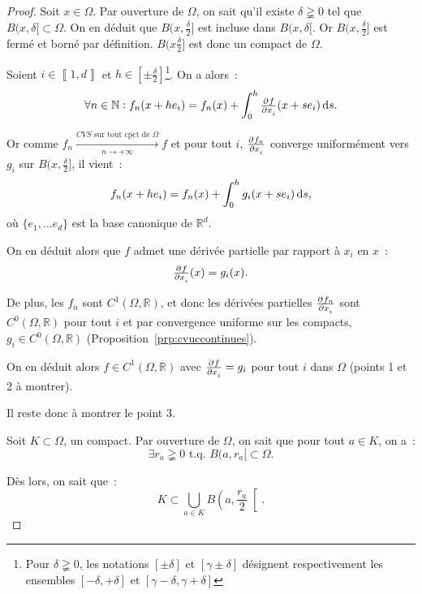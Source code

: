 \documentclass{report}
\theoremstyle{definition}
\theoremstyle{remark}
\numberwithin{equation}{section}
\newcommand{\R}{\mathbb R}
\newcommand{\N}{\mathbb N}
\newcommand{\tq}{\text{ t.q. }}
\newcommand{\CONV}[5]{\xrightarrow[#2 \to #3]{#4 \text{ #5 } #1}}
\newcommand{\CVSc}[3]{\CONV{#1}{#2}{#3}{CVS}{sur tout cpct de}}
\newcommand{\intint}[2]{\left\llbracket#1, #2\right\rrbracket}
\newcommand{\pinfty}{{+\infty}}
\begin{document}
			\begin{proof} Soit $x \in \Omega$. Par ouverture de $\Omega$, on sait qu'il existe $\delta \gneqq 0$ tel que $B(x, \delta[ \subset \Omega$.
			On en déduit que $B(x, \frac \delta2]$ est incluse dans $B(x, \delta[$. Or $B(x, \frac \delta2]$ est fermé et borné par définition.
			$B(x \frac \delta2]$ est donc un compact de $\Omega$.

			Soient $i \in \intint 1d$ et $h \in [\pm \frac \delta2]$\footnote{Pour $\delta \gneqq 0$, les notations $[\pm \delta]$ et $[\gamma \pm \delta]$
			désignent respectivement les ensembles $[-\delta, +\delta]$ et $[\gamma-\delta, \gamma+\delta]$}. On a alors~:
			\begin{equation}
				\forall n \in \N : f_n(x + he_i) = f_n(x) + \int_0^h\pd f{x_i}(x+s e_i)\dif s.
			\end{equation}

			Or comme $f_n \CVSc \Omega n\pinfty f$ et pour tout $i$, $\pd {f_n}{x_i}$ converge uniformément vers $g_i$ sur $B(x, \frac \delta2]$, il vient~:
			\begin{equation}
				f_n(x + he_i) = f_n(x) + \int_0^hg_i(x+se_i)\dif s,
			\end{equation}
			où $\{e_1, \ldots e_d\}$ est la base canonique de $\R^d$.

			On en déduit alors que $f$ admet une dérivée partielle par rapport à $x_i$ en $x$~:
			\begin{equation}
				\pd f{x_i}(x) = g_i(x).
			\end{equation}

			De plus, les $f_n$ sont $C^1(\Omega, \R)$, et donc les dérivées partielles $\pd {f_n}{x_i}$ sont $C^0(\Omega, \R)$ pour tout $i$ et par convergence
			uniforme sur les compacts, $g_i \in C^0(\Omega, \R)$ (Proposition~\ref{prp:cvuccontinues}).

			On en déduit alors $f \in C^1(\Omega, \R)$ avec $\pd f{x_i} = g_i$ pour tout $i$ dans $\Omega$ (points 1 et 2 à montrer).

			Il reste donc à montrer le point 3.

			Soit $K \subset \Omega$, un compact. Par ouverture de $\Omega$, on sait que pour tout $a \in K$, on a~:
			\begin{equation}
				\exists r_a \gneqq 0 \tq B(a, r_a[ \subset \Omega.
			\end{equation}

			Dès lors, on sait que~:
			\begin{equation}
				K \subset \bigcup_{a \in K}B\left(a, \frac {r_a}2\right[.
			\end{equation}


\end{proof}
\end{document}
